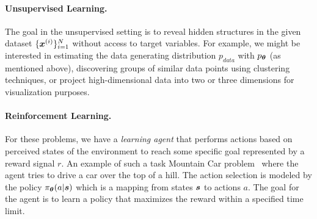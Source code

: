 \vspace{-3mm}
\paragraph{Unsupervised Learning.} The goal in the unsupervised setting is to reveal hidden structures in the given dataset $\{{\bm{x}}^{(i)}\}_{i=1}^{N}$ without access to target variables. For example, we might be interested in estimating the data generating distribution $p_{data}$ with $p_{{\bm{\theta}}}$ (as mentioned above), discovering groups of similar data points using clustering techniques, or project high-dimensional data into two or three dimensions for visualization purposes. 


\vspace{-3mm}
\paragraph{Reinforcement Learning.} For these problems, we have a \textit{learning agent}
that performs actions based on perceived states of the environment to reach some specific goal represented by a reward signal $r$. An example of such a task Mountain Car problem~\cite{sutton2018reinforcement} where the agent tries to drive a car over the top of a hill. The action selection is modeled by the policy $\pi_{{\bm{\theta}}}(a | {\bm{s}})$ which is a mapping from states ${\bm{s}}$ to actions $a$. The goal for the agent is to learn a policy that maximizes the reward within a specified time limit. 


